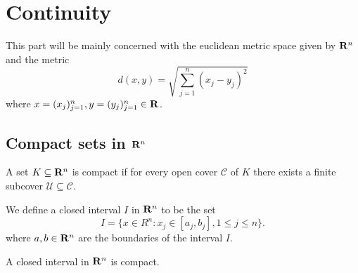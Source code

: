 \section{Continuity}

\begin{remark}
This part will be mainly concerned with the euclidean metric space given by
\(\mathbf{R}^n\) and the metric
\[
d(x, y) = \sqrt{\sum_{j=1}^n (x_j - y_j)^2}
\]
where \(x = (x_j)_{j=1}^n, y = (y_j)_{j=1}^n \in \mathbf{R}\).
\end{remark}

\subsection{Compact sets in \texorpdfstring{\(\mathbf{R}^n\)}{Rn}}

\begin{definition}
A set \(K \subseteq \mathbf{R}^n\) is compact if for every open cover \(\mathcal C\)
of \(K\) there exists a finite subcover \(\mathcal U \subseteq \mathcal C\).
\end{definition}

\begin{definition}
We define a closed interval \(I\) in \(\mathbf{R}^n\) to be the set
\[
I = \{x \in R^n \colon x_j \in [a_j, b_j], 1 \leq j \leq n\}.
\]
where \(a, b \in \mathbf{R}^n\) are the boundaries of the interval \(I\).
\end{definition}

\begin{proposition}\label{prop: closed-interval compact}
A closed interval in \(\mathbf{R}^n\) is compact.
\end{proposition}

